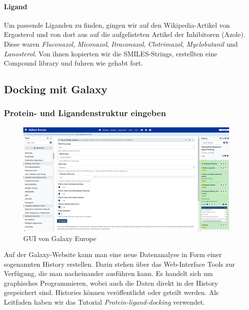 \documentclass[10pt]{article}
\begin{document}
    \paragraph{Ligand}
    Um passende Liganden zu finden, gingen wir auf den Wikipedia-Artikel von Ergosterol und von dort aus auf die
    aufgelisteten Artikel der Inhibitoren (Azole). Diese waren \emph{Fluconazol}, \emph{Miconazol},
    \emph{Itraconazol}, \emph{Clotrimazol},
    \emph{Myclobutanil} und \emph{Lanosterol}.\cite{32, 33, 34, 35, 37} Von ihnen
    kopierten wir die SMILES-Strings, erstellten eine Compound
    library und
    fuhren wie gehabt fort.

    \subsection{Docking mit Galaxy}\label{subsec:galaxy}

    \subsubsection{Protein- und Ligandenstruktur eingeben}\label{subsubsec:protein--und-ligandenstruktur-eingeben}

    \begin{figure}
        \includegraphics[width=\linewidth]{Aussehen der Galaxy-Website}
        \caption{GUI von Galaxy Europe}
    \end{figure}

    Auf der Galaxy-Website kann man eine neue Datenanalyse in Form einer sogenannten History erstellen.
    Darin stehen über das Web-Interface Tools zur Verfügung, die man nacheinander ausführen kann.
    Es handelt sich um graphisches Programmieren, wobei auch die Daten direkt in der History gespeichert sind.
    Histories können veröffentlicht oder geteilt werden.
    Als Leitfaden haben wir das Tutorial \emph{Protein-ligand-docking} verwendet.\cite{4}
\end{document}
